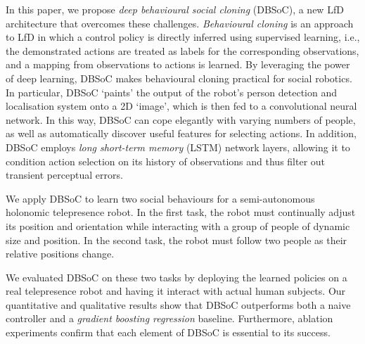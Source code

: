 \documentclass[letterpaper, 10 pt, conference]{ieeeconf}
\begin{document}
In this paper, we propose \emph{deep behavioural social cloning} (DBSoC), a new LfD architecture that overcomes these challenges.  \emph{Behavioural cloning} is an approach to LfD in which a control policy is directly inferred using supervised learning, i.e., the demonstrated actions are treated as labels for the corresponding observations, and a mapping from observations to actions is learned.  By leveraging the power of deep learning, DBSoC makes behavioural cloning practical for social robotics.  In particular, DBSoC `paints' the output of the robot's person detection and localisation system onto a 2D `image', which is then fed to a convolutional neural network.  In this way, DBSoC can cope elegantly with varying numbers of people, as well as automatically discover useful features for selecting actions.  In addition, DBSoC employs \emph{long short-term memory} (LSTM) \cite{hochreiter1997long} network layers, allowing it to condition action selection on its history of observations and thus filter out transient perceptual errors.


We apply DBSoC to learn two social behaviours for a semi-autonomous holonomic telepresence robot. In the first task, the robot must continually adjust its position and orientation while interacting with a group of people of dynamic size and position.  In the second task, the robot must follow two people as their relative positions change.

We evaluated DBSoC on these two tasks by deploying the learned policies on a real telepresence robot and having it interact with actual human subjects.  Our quantitative and qualitative results show that DBSoC outperforms both a naive controller and a \emph{gradient boosting regression} baseline.  Furthermore, ablation experiments confirm that each element of DBSoC is essential to its success.

\end{document}
